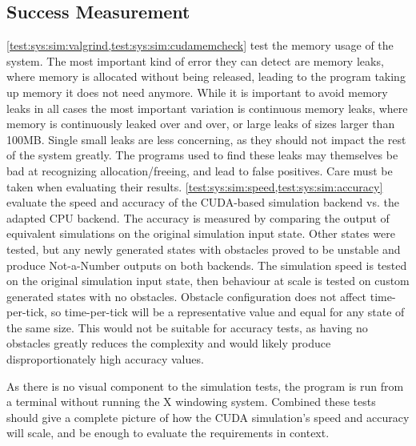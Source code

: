 \subsection{Success Measurement}\label{sec:Testing:SuccessMeasurement}
\cref{test:sys:sim:valgrind,test:sys:sim:cudamemcheck} test the memory usage of the system.
The most important kind of error they can detect are memory leaks, where memory is allocated without being released, leading to the program taking up memory it does not need anymore.
While it is important to avoid memory leaks in all cases the most important variation is continuous memory leaks, where memory is continuously leaked over and over, or large leaks of sizes larger than 100MB.
Single small leaks are less concerning, as they should not impact the rest of the system greatly.
The programs used to find these leaks may themselves be bad at recognizing allocation/freeing\cite{ValgrindProblemsBlog}, and lead to false positives.
Care must be taken when evaluating their results.
\cref{test:sys:sim:speed,test:sys:sim:accuracy} evaluate the speed and accuracy of the CUDA-based simulation backend vs. the adapted CPU backend.
The accuracy is measured by comparing the output of equivalent simulations on the original simulation input state.
Other states were tested, but any newly generated states with obstacles proved to be unstable and produce Not-a-Number outputs on both backends.
The simulation speed is tested on the original simulation input state, then behaviour at scale is tested on custom generated states with no obstacles.
Obstacle configuration does not affect time-per-tick, so time-per-tick will be a representative value and equal for any state of the same size.
This would not be suitable for accuracy tests, as having no obstacles greatly reduces the complexity and would likely produce disproportionately high accuracy values.

As there is no visual component to the simulation tests, the program is run from a terminal without running the X windowing system.
Combined these tests should give a complete picture of how the CUDA simulation's speed and accuracy will scale, and be enough to evaluate the requirements in context.

